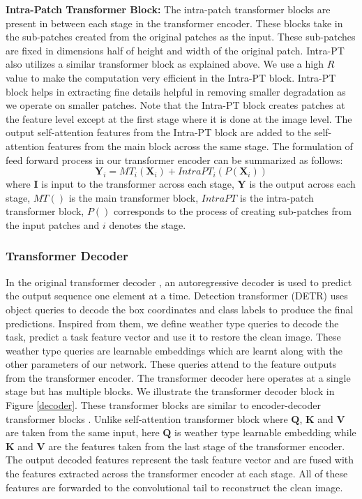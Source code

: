 \documentclass[10pt,twocolumn,letterpaper]{article}
\begin{document}
\noindent \textbf{Intra-Patch Transformer Block:} The intra-patch transformer blocks are present in between each stage in the transformer encoder. These blocks take in the sub-patches created from the original patches as the input. These sub-patches are fixed in dimensions half of height and width of the original patch. Intra-PT also utilizes a similar transformer block as explained above. We use a high $R$ value to make the computation very efficient in the Intra-PT block. Intra-PT block helps in extracting fine details helpful in removing smaller degradation as we operate on smaller patches. Note that the Intra-PT block creates patches at the feature level except at the first stage where it is done at the image level. The output self-attention features from the Intra-PT block are added to the self-attention features from the main block across the same stage. The formulation of feed forward process in our transformer encoder can be summarized as follows:
\begin{equation}
	\textbf{Y}_i = MT_i(\textbf{X}_i) + IntraPT_i(P(\textbf{X}_i))
\end{equation}
where $\textbf{I}$ is input to the transformer across each stage, $\textbf{Y}$ is the output across each stage,  $MT()$ is the main transformer block, $IntraPT$ is the intra-patch transformer block, $P()$ corresponds to the process of creating sub-patches from the input patches and $i$ denotes the stage. 
\vspace{-1em}
\subsubsection{Transformer Decoder}

In the original transformer decoder \cite{vaswani2017attention}, an autoregressive decoder is used to predict the output sequence one element at a time. Detection transformer (DETR) \cite{carion2020end} uses object queries to decode the box coordinates and class labels to produce the final predictions. Inspired from them, we define weather type queries to decode the task, predict a task feature vector and use it to restore the clean image. These weather type queries are learnable embeddings which are learnt along with the other parameters of our network. These queries attend to the feature outputs from the transformer encoder. The transformer decoder here operates at a single stage but has multiple blocks.  We illustrate the transformer decoder block in Figure \ref{decoder}. These transformer blocks are similar to  encoder-decoder transformer blocks \cite{vaswani2017attention}. Unlike self-attention transformer block where $\textbf{Q}$, $\textbf{K}$ and $\textbf{V}$ are taken from the same input, here $\textbf{Q}$ is weather type learnable embedding  while $\textbf{K}$ and $\textbf{V}$ are the features taken from the last stage of the transformer encoder. The output decoded features represent the task feature vector and are fused with the features extracted across the transformer encoder at each stage. All of these features are forwarded to the convolutional tail to reconstruct the clean image.
\end{document}
